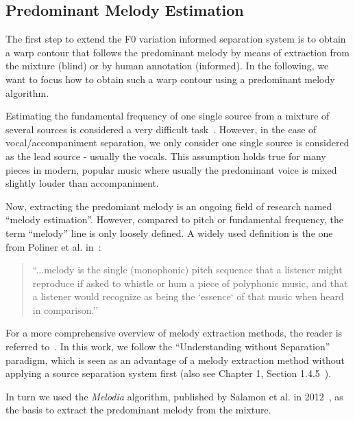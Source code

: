 \subsection{Predominant Melody Estimation}

The first step to extend the F0 variation informed separation system is to obtain a warp contour that follows the predominant melody by means of extraction from the mixture (blind) or by human annotation (informed).
In the following, we want to focus how to obtain such a warp contour using a predominant melody algorithm.\par

Estimating the fundamental frequency of one single source from a mixture of several sources is considered a very difficult task~\cite{klapuri08}.
However, in the case of vocal/accompaniment separation, we only consider one single source is considered as the lead source - usually the vocals.
This assumption holds true for many pieces in modern, popular music where usually the predominant voice is mixed slightly louder than accompaniment.
\par
Now, extracting the predomiant melody is an ongoing field of research named ``melody estimation''.
However, compared to pitch or fundamental frequency, the term ``melody'' line  is only loosely defined.
A widely used definition is the one from Poliner et al. in~\cite{poliner07}:

\begin{quote}
  ``...melody is the single (monophonic) pitch sequence that a listener might reproduce if asked to whistle or hum a piece of polyphonic music, and that a listener would recognize as being the `essence` of that music when heard in comparison.''
\end{quote}

For a more comprehensive overview of melody extraction methods, the reader is referred to~\cite{salamon14}.
In this work, we follow the ``Understanding without Separation'' paradigm, which is seen as an advantage of a melody extraction method without applying a source separation system first (also see Chapter 1, Section 1.4.5~\cite{salamon14}).\par

In turn we used the \emph{Melodia} algorithm, published by Salamon et al. in 2012~\cite{salamon12}, as the basis to extract the predominant melody from the mixture.\par

